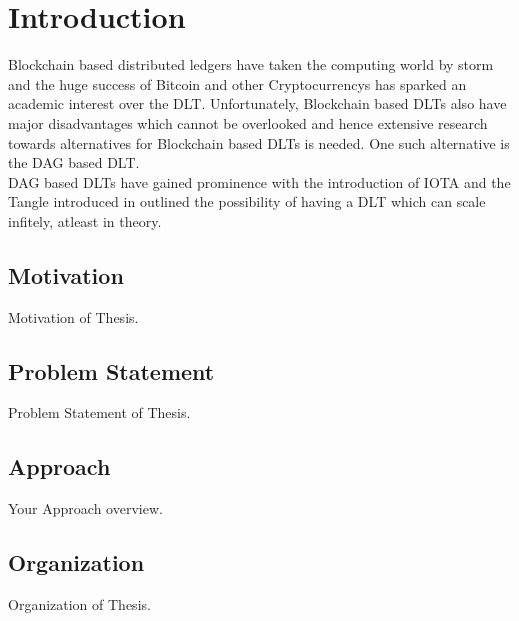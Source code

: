 \chapter{Introduction} 
\label{chapter:introduction}

\gls{Blockchain} based distributed ledgers have taken the computing world by storm and the huge success of Bitcoin and other \glspl{Cryptocurrency} has sparked an academic interest over the \gls{DLT}. Unfortunately, Blockchain based DLTs also have major disadvantages which cannot be overlooked and hence extensive research towards alternatives for Blockchain based \gls{DLT}s is needed. One such alternative is the \gls{DAG} based \gls{DLT}. \\

\gls{DAG} based DLTs have gained prominence with the introduction of IOTA and the Tangle introduced in \cite{Tangle} outlined the possibility of having a DLT which can scale infitely, atleast in theory.

\section{Motivation} 
\label{sec:motivation}

Motivation of Thesis.

\section{Problem Statement} 
\label{sec:problemStatement}

Problem Statement of Thesis.

\section{Approach}
 \label{sec:approach}

Your Approach overview.

\section{Organization}
 \label{sec:organization}

Organization of Thesis.